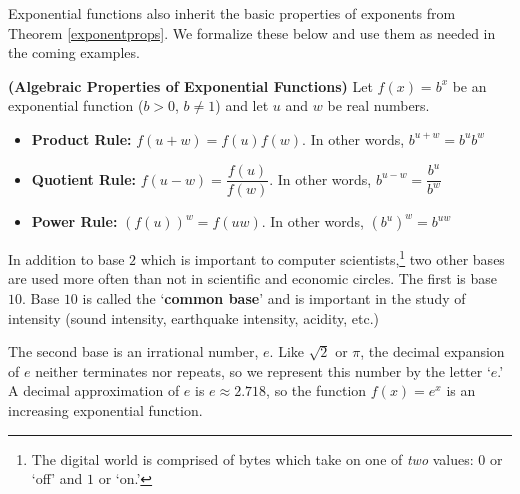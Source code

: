 \documentclass{ximera}
\begin{document}
\smallskip


Exponential functions also inherit the basic properties of exponents from Theorem \ref{exponentprops}.  We formalize these below and use them as needed in the coming examples.

\smallskip

\colorbox{ResultColor}{\bbm

\begin{thm}  \label{algpropexpfcns} \textbf{(Algebraic Properties of Exponential Functions)}  Let $f(x) = b^{x}$ be an exponential function ($b > 0$, $b\neq 1$) and let $u$ and $w$ be real numbers. 

\begin{itemize}

\item  \textbf{Product Rule:}  $f(u+w) = f(u) f(w)$.  In other words, $b^{u+w} = b^{u} b^{w}$

\item  \textbf{Quotient Rule:}  $f(u-w) = \dfrac{f(u)}{f(w)}$.  In other words, $b^{u-w} = \dfrac{b^{u}}{b^{w}}$

\item  \textbf{Power Rule:}  $\left(f(u)\right)^w = f(uw)$.  In other words, $\left(b^{u}\right)^{w} = b^{uw}$

\end{itemize}

\end{thm}

\ebm}

\smallskip

In addition to base $2$ which is important to computer scientists,\footnote{The digital world is comprised of bytes which take on one of \textit{two} values: $0$ or `off' and $1$ or `on.'} two other bases are used more often than not in scientific and economic circles.  The first is base  $10$.  Base $10$ is called the `\textbf{common base}' and is important in the study of intensity (sound intensity, earthquake intensity, acidity, etc.)   

\smallskip


The second base is an irrational number, $e$.  Like $\sqrt{2}$ or $\pi$, the decimal expansion of $e$ neither terminates nor repeats, so we represent this number by the letter `$e$.'  A decimal approximation of $e$ is $e \approx 2.718$, so the function $f(x) = e^{x}$ is an increasing exponential function.   
\end{document}
